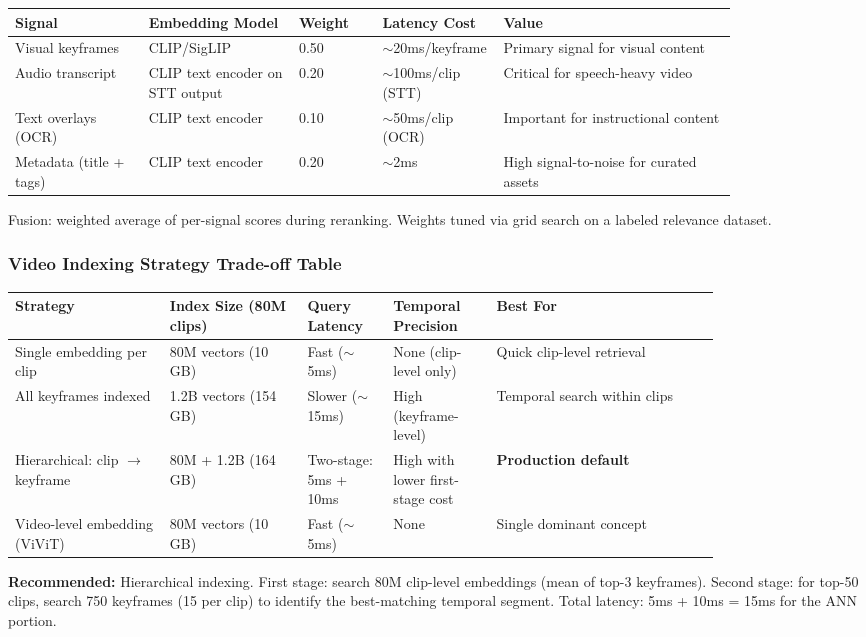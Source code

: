 \begin{tabular}{|p{0.16\linewidth}|p{0.18\linewidth}|p{0.10\linewidth}|p{0.12\linewidth}|p{0.28\linewidth}|}
\hline
\textbf{Signal} & \textbf{Embedding Model} & \textbf{Weight} & \textbf{Latency Cost} & \textbf{Value} \\
\hline
Visual keyframes & CLIP/SigLIP & 0.50 & $\sim$20ms/keyframe & Primary signal for visual content \\
\hline
Audio transcript & CLIP text encoder on STT output & 0.20 & $\sim$100ms/clip (STT) & Critical for speech-heavy video \\
\hline
Text overlays (OCR) & CLIP text encoder & 0.10 & $\sim$50ms/clip (OCR) & Important for instructional content \\
\hline
Metadata (title + tags) & CLIP text encoder & 0.20 & $\sim$2ms & High signal-to-noise for curated assets \\
\hline
\end{tabular}

Fusion: weighted average of per-signal scores during reranking. Weights tuned via grid search on a labeled relevance dataset.

\subsubsection*{Video Indexing Strategy Trade-off Table}

\begin{tabular}{|p{0.18\linewidth}|p{0.16\linewidth}|p{0.10\linewidth}|p{0.12\linewidth}|p{0.26\linewidth}|}
\hline
\textbf{Strategy} & \textbf{Index Size (80M clips)} & \textbf{Query Latency} & \textbf{Temporal Precision} & \textbf{Best For} \\
\hline
Single embedding per clip & 80M vectors (10 GB) & Fast ($\sim$5ms) & None (clip-level only) & Quick clip-level retrieval \\
\hline
All keyframes indexed & 1.2B vectors (154 GB) & Slower ($\sim$15ms) & High (keyframe-level) & Temporal search within clips \\
\hline
Hierarchical: clip $\rightarrow$ keyframe & 80M + 1.2B (164 GB) & Two-stage: 5ms + 10ms & High with lower first-stage cost & \textbf{Production default} \\
\hline
Video-level embedding (ViViT) & 80M vectors (10 GB) & Fast ($\sim$5ms) & None & Single dominant concept \\
\hline
\end{tabular}

\textbf{Recommended:} Hierarchical indexing. First stage: search 80M clip-level embeddings (mean of top-3 keyframes). Second stage: for top-50 clips, search 750 keyframes (15 per clip) to identify the best-matching temporal segment. Total latency: 5ms + 10ms = 15ms for the ANN portion.

